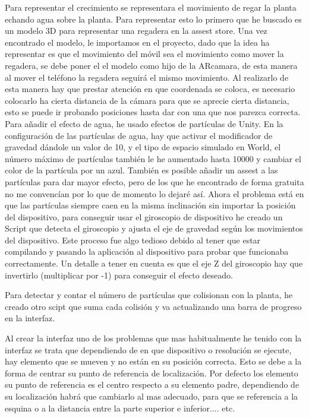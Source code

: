 Para representar el crecimiento se representara el movimiento de regar la planta echando agua sobre la planta. Para representar esto lo primero que he buscado es un modelo 3D para representar una regadera en la assest store. Una vez encontrado el modelo, le importamos en el proyecto, dado que la idea ha representar es que el movimiento del móvil sea el movimiento como mover la regadera, se debe poner el el modelo como hijo de la ARcamara, de esta manera al mover el teléfono la regadera seguirá el mismo movimiento. Al realizarlo de esta manera hay que prestar atención en que coordenada se coloca, es necesario colocarlo ha cierta distancia de la cámara para que se aprecie cierta distancia, esto se puede ir probando posiciones hasta dar con una que nos parezca correcta. Para añadir el efecto de agua, he usado efectos de partículas de Unity. En la configuración de las partículas de agua, hay que activar el modificador de gravedad dándole un valor de 10, y el tipo de espacio simulado en World, el número máximo de partículas también le he aumentado hasta 10000 y cambiar el color de la partícula por un azul. También es posible añadir un assest a las partículas para dar mayor efecto, pero de los que he encontrado de forma gratuita no me convencían por lo que de momento lo dejaré así. Ahora el problema está en que las partículas siempre caen en la misma inclinación sin importar la posición del dispositivo, para conseguir usar el giroscopio de dispositivo he creado un Script que detecta el giroscopio y ajusta el eje de gravedad según los movimientos del dispositivo. Este proceso fue algo tedioso debido al tener que estar compilando y pasando la aplicación al dispositivo para probar que funcionaba correctamente. Un detalle a tener en cuenta es que el eje Z del giroscopio hay que invertirlo (multiplicar por -1) para conseguir el efecto deseado.

Para detectar y contar el número de partículas que colisionan con la planta, he creado otro scipt que suma cada colisión y va actualizando una barra de progreso en la interfaz.


Al crear la interfaz uno de los problemas que mas habitualmente he tenido con la interfaz se trata que dependiendo de en que dispositivo o resolución se ejecute, hay elemento que se mueven y no están en su posición correcta. Esto se debe a la forma de centrar su punto de referencia de localización. Por defecto los elemento su punto de referencia es el centro respecto a su elemento padre, dependiendo de su localización habrá que cambiarlo al mas adecuado, para que se referencia a la esquina o a la distancia entre la parte superior e inferior.... etc.



